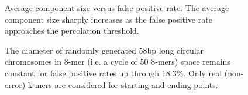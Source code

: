 \documentclass{pnastwo}
\begin{document}
\clearpage

\begin{figure}
\caption{Average component size versus false positive rate. The average 
component size sharply increases as the false positive 
rate approaches the percolation threshold.
}
\label{fig:clustersize}
\end{figure}

\clearpage

\begin{figure}

\caption{The diameter of randomly generated 58bp long circular
  chromosomes in 8-mer (i.e. a cycle of 50 8-mers) space remains 
constant for false
  positive rates up through 18.3\%. Only real (non-error) k-mers are considered for
  starting and ending points.}
\label{fig:diam}
\end{figure}
\end{document}

